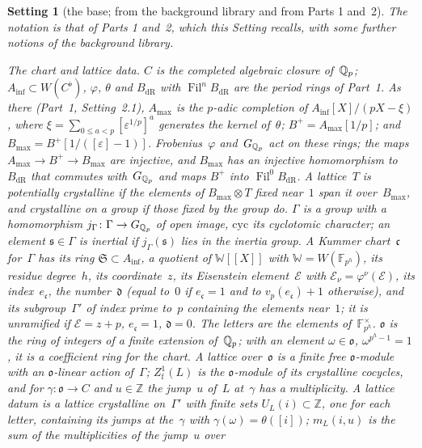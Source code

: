 \documentclass[11pt,a4paper]{article}
\newcommand{\kw}[1]{\emph{#1}}
\newcommand{\m}[1]{\mbox{$#1$}}        %
\theoremstyle{plainx}
\theoremstyle{uprightx}
\newtheorem{setting}[theorem]{Setting}          %
\providecommand{\Ainf}{A_{\inf}}\providecommand{\WC}{W(C^{\flat})}\providecommand{\BdR}{B_{\mathrm{dR}}}
\providecommand{\Fil}{\operatorname{Fil}}\providecommand{\fS}{\mathfrak{S}}\providecommand{\cE}{\mathcal{E}}
\providecommand{\fo}{\mathfrak{o}}\providecommand{\fc}{\mathfrak{c}}\providecommand{\fd}{\mathfrak{d}}
\providecommand{\WW}{\mathbb{W}}\providecommand{\Per}{\operatorname{Per}}\providecommand{\pr}{\operatorname{pr}}
\begin{document}
\begin{setting}[the base; from the background library and from Parts 1 and~2]\label{set:base}
The notation is that of Parts 1 and~2, which this Setting recalls, with some further notions of the background
library.

\emph{The chart and lattice data.} $C$ is the completed algebraic closure of~$\mathbb{Q}_p$; \m{\Ainf\subset\WC},
$\varphi$, $\theta$ and $\BdR$ with \m{\Fil^{n}\BdR} are the period rings of Part~1. As there (Part~1,
Setting~2.1), $A_{\max}$ is the $p$-adic completion of \m{\Ainf[X]/(pX-\xi)}, where
\m{\xi=\sum_{0\le a<p}[\varepsilon^{1/p}]^{a}} generates the kernel of~$\theta$; \m{B^{+}=A_{\max}[1/p]};
and \m{B_{\max}=B^{+}[1/([\varepsilon]-1)]}. Frobenius~$\varphi$ and~$G_{\mathbb{Q}_p}$ act on these rings; the maps
\m{A_{\max}\to B^{+}\to B_{\max}} are injective, and \m{B_{\max}} has an injective homomorphism
to~$\BdR$ that commutes with~$G_{\mathbb{Q}_p}$ and maps \m{B^{+}} into \m{\Fil^{0}\BdR}. A lattice~$T$ is
\kw{potentially crystalline} if the elements of \m{B_{\max}\otimes T} fixed near~$1$ span it
over~$B_{\max}$, and \kw{crystalline} on a group if those fixed by the group do. $\Gamma$ is a
group with a homomorphism $j_\Gamma\colon\Gamma\to G_{\mathbb{Q}_p}$ of open image, $\mathrm{cyc}$ its cyclotomic character; an
element \m{\mathfrak{s}\in\Gamma} is \kw{inertial} if \m{j_\Gamma(\mathfrak{s})} lies in the inertia group. A Kummer chart~$\fc$
for~$\Gamma$ has its ring \m{\fS\subset\Ainf}, a quotient of \m{\WW[[X]]} with $\WW=W(\mathbb{F}_{p^h})$, its
residue degree~$h$, its coordinate~$z$, its Eisenstein element~$\cE$ with $\cE_\nu=\varphi^{\nu}(\cE)$, its
index~$e_{\fc}$, the number~$\fd$ (equal to~$0$ if \m{e_{\fc}=1} and to \m{v_p(e_{\fc})+1} otherwise), and its
subgroup~$\Gamma'$ of index prime to~$p$ containing the elements near~$1$; it is \kw{unramified} if
\m{\cE=z+p}, \m{e_{\fc}=1}, \m{\fd=0}. The \kw{letters} are the elements of~$\mathbb{F}_{p^h}^\times$.
$\fo$ is the ring of integers of a finite extension of~$\mathbb{Q}_p$; with an element \m{\omega\in\fo},
\m{\omega^{p^h-1}=1}, it is a coefficient ring for the chart. A \kw{lattice} over~$\fo$ is a finite free
$\fo$-module with an $\fo$-linear action of~$\Gamma$; $Z^{1}_{\mathrm{f}}(L)$ is the $\fo$-module of its
crystalline cocycles, and for $\gamma\colon\fo\to C$ and \m{u\in\mathbb{Z}} the jump~$u$ of~$L$ at~$\gamma$
has a multiplicity. A \kw{lattice datum} is a lattice crystalline on~$\Gamma'$ with finite sets
$U_L(i)\subset\mathbb{Z}$, one for each letter, containing its jumps at the~$\gamma$ with
$\gamma(\omega)=\theta([i])$; \m{m_L(i,u)} is the sum of the multiplicities of the jump~$u$ over

\end{setting}
\end{document}
